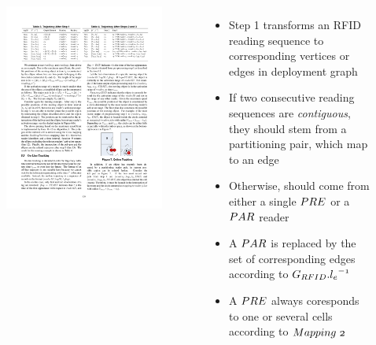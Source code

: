 \begin{frame}
\begin{columns}[c]
\begin{figure}[tb]
      \includegraphics[width=\columnwidth]{figures/2-1-10.pdf}
    \end{figure}


  \footnotesize{
    \begin{itemize}
      \item Step 1 transforms an RFID reading sequence to corresponding vertices or edges in deployment graph
      \item If two consecutive reading sequences are \emph{contiguous}, they should stem from a partitioning pair, which map to an edge
      \item Otherwise, should come from either a single $\mathnormal{PRE}$ or a $\mathnormal{PAR}$ reader
      \item A $\mathnormal{PAR}$ is replaced by the set of corresponding edges according to $\mathnormal{G_{RFID}.{l_e}^{-1}}$
      \item A $\mathnormal{PRE}$ always coresponds to one or several cells according to $\mathnormal{Mapping~2}$
    \end{itemize}
  }
  \end{columns}

\end{frame}


